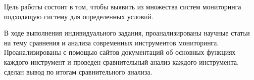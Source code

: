 Цель работы состоит в том, чтобы выявить из множества систем мониторинга подходящую систему для определенных условий.

В ходе выполнения индивидуального задания, проанализированы научные статьи 
на тему сравнения и анализа современных инструментов мониторинга. Проанализированы 
с помощью сайтов документаций об основных функциях каждого инструмент и проведен сравнительный анализ каждого
инструмента, сделан вывод по итогам сравнительного анализа.

\clearpage